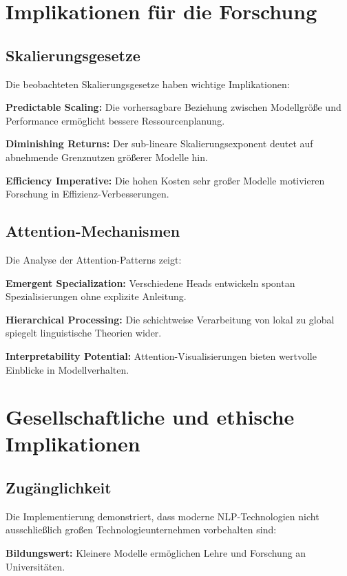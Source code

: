 \section{Implikationen für die Forschung}

\subsection{Skalierungsgesetze}

Die beobachteten Skalierungsgesetze haben wichtige Implikationen:

\textbf{Predictable Scaling:} Die vorhersagbare Beziehung zwischen Modellgröße und Performance ermöglicht bessere Ressourcenplanung.

\textbf{Diminishing Returns:} Der sub-lineare Skalierungsexponent deutet auf abnehmende Grenznutzen größerer Modelle hin.

\textbf{Efficiency Imperative:} Die hohen Kosten sehr großer Modelle motivieren Forschung in Effizienz-Verbesserungen.

\subsection{Attention-Mechanismen}

Die Analyse der Attention-Patterns zeigt:

\textbf{Emergent Specialization:} Verschiedene Heads entwickeln spontan Spezialisierungen ohne explizite Anleitung.

\textbf{Hierarchical Processing:} Die schichtweise Verarbeitung von lokal zu global spiegelt linguistische Theorien wider.

\textbf{Interpretability Potential:} Attention-Visualisierungen bieten wertvolle Einblicke in Modellverhalten.

\section{Gesellschaftliche und ethische Implikationen}

\subsection{Zugänglichkeit}

Die Implementierung demonstriert, dass moderne NLP-Technologien nicht ausschließlich großen Technologieunternehmen vorbehalten sind:

\textbf{Bildungswert:} Kleinere Modelle ermöglichen Lehre und Forschung an Universitäten.

